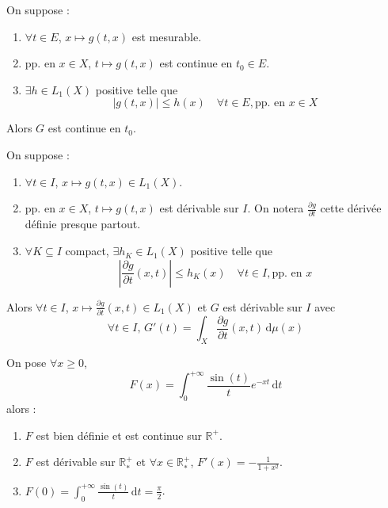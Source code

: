   \begin{theorem}
    On suppose :
    \begin{enumerate}[label=(\roman*)]
      \item $\forall t \in E$, $x \mapsto g(t,x)$ est mesurable.
      \item pp. en $x \in X$, $t \mapsto g(t,x)$ est continue en $t_0 \in E$.
      \item $\exists h \in L_1(X)$ positive telle que
      \[ |g(t,x)| \leq h(x) \quad \forall t \in E, \text{pp. en } x \in X \]
    \end{enumerate}
    Alors $G$ est continue en $t_0$.
  \end{theorem}

  \begin{theorem}
    On suppose :
    \begin{enumerate}[label=(\roman*)]
      \item $\forall t \in I$, $x \mapsto g(t,x) \in L_1(X)$.
      \item pp. en $x \in X$, $t \mapsto g(t,x)$ est dérivable sur $I$. On notera $\frac{\partial g}{\partial t}$ cette dérivée définie presque partout.
      \item $\forall K \subseteq I$ compact, $\exists h_K \in L_1(X)$ positive telle que
      \[ \left| \frac{\partial g}{\partial t}(x,t) \right| \leq h_K(x) \quad \forall t \in I, \text{pp. en } x \]
    \end{enumerate}
    Alors $\forall t \in I$, $x \mapsto \frac{\partial g}{\partial t}(x, t) \in L_1(X)$ et $G$ est dérivable sur $I$ avec
    \[ \forall t \in I, \, G'(t) = \int_X \frac{\partial g}{\partial t}(x, t) \, \mathrm{d}\mu(x) \]
  \end{theorem}


  \begin{application}
    On pose $\forall x \geq 0$,
    \[ F(x) = \int_0^{+\infty} \frac{\sin(t)}{t} e^{-xt} \, \mathrm{d}t \]
    alors :
    \begin{enumerate}[label=(\roman*)]
      \item $F$ est bien définie et est continue sur $\mathbb{R}^+$.
      \item $F$ est dérivable sur $\mathbb{R}^+_*$ et $\forall x \in \mathbb{R}^+_*$, $F'(x) = -\frac{1}{1+x^2}$.
      \item $F(0) = \int_0^{+\infty} \frac{\sin(t)}{t} \, \mathrm{d}t = \frac{\pi}{2}$.
    \end{enumerate}
  \end{application}

